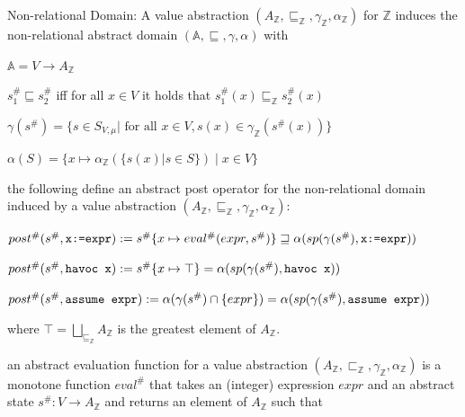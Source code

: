 \documentclass[landscape, a4paper]{article}
\begin{document}
\begin{minipage}[t]{0.2\linewidth}
	\begin{betterlist}
		\item \color{orange}\alert{Non-relational Domain:} A value abstraction $(A_{\mathbb{Z}}, \sqsubseteq_{\mathbb{Z}}, \gamma_{\mathbb{Z}}, \alpha_{\mathbb{Z}})$ for $\mathbb{Z}$ induces the \alert{non-relational abstract domain} $(\mathbb{A}, \sqsubseteq, \gamma, \alpha)$ with
		\begin{betterlist}
			\item $\mathbb{A} = V \rightarrow A_{\mathbb{Z}}$
			\item $s^\#_1 \sqsubseteq s^\#_2$ iff for all $x \in V$ it holds that $s^\#_1(x) \sqsubseteq_{\mathbb{Z}} s^\#_2(x)$
			\item $\gamma(s^\#) = \{s \in S_{V ,\mu} | \text{ for all } x \in V, s(x) \in \gamma_{\mathbb{Z}}(s^\#(x))\}$
			\item $\alpha(S) = \{x \mapsto \alpha_{\mathbb{Z}}(\{s(x) | s \in S\}) \mid x \in V\}$
			\item {}
			\item the following  define an abstract post operator for the non-relational domain induced by a value abstraction $(A_{\mathbb{Z}}, \sqsubseteq_{\mathbb{Z}}, \gamma_{\mathbb{Z}}, \alpha_{\mathbb{Z}})$:
			\begin{betterlist}
				\item $post^\#(s^\#, \verb|x:=expr|) := s^\#\{x \mapsto eval^\#(expr, s^\#)\} \sqsupseteq \alpha(sp(\gamma(s^\#), \verb|x:=expr|))$
				\item $post^\#(s^\#, \verb|havoc x|) := s^\#\{x \mapsto \top\} = \alpha(sp(\gamma(s^\#), \verb|havoc x|))$
				\item $post^\#(s^\#, \verb|assume expr|) := \alpha(\gamma(s^\#) \cap \{expr\}) = \alpha(sp(\gamma(s^\#), \verb|assume expr|))$
			\end{betterlist}
			where $\top= \bigsqcup_{\sqsubseteq_{\mathbb{Z}}} A_{\mathbb{Z}}$ is the greatest element of $A_{\mathbb{Z}}$. 
		\end{betterlist}\color{black}
		\item \color{orange}an \alert{abstract evaluation function} for a value abstraction $(A_{\mathbb{Z}}, \sqsubset_{\mathbb{Z}}, \gamma_{\mathbb{Z}}, \alpha_{\mathbb{Z}})$ is a monotone function $eval^\#$ that takes an (integer) expression $expr$ and an abstract state $s^\#: V \rightarrow A_{\mathbb{Z}}$ and returns an element of $A_{\mathbb{Z}}$ such that

\end{betterlist}
\end{minipage}
\end{document}
